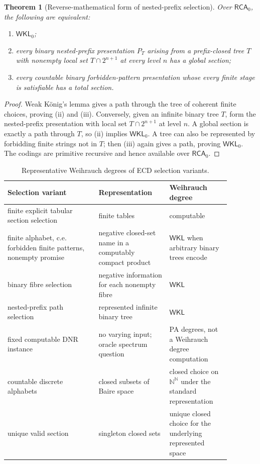 \documentclass[11pt]{article}
\theoremstyle{plain}
\newtheorem{theorem}{Theorem}[section]
\theoremstyle{definition}
\theoremstyle{remark}
\newcommand{\N}{\mathbb{N}}
\begin{document}
\begin{theorem}[Reverse-mathematical form of nested-prefix selection]
\label{thm:reverse-math-nested-prefix}
Over $\mathsf{RCA}_0$, the following are equivalent:
\begin{enumerate}[label=(\roman*)]
\item $\mathsf{WKL}_0$;
\item every binary nested-prefix presentation $P_T$ arising from a prefix-closed
tree $T$ with nonempty local set $T\cap2^{n+1}$ at every level $n$ has a global
section;
\item every countable binary forbidden-pattern presentation whose every finite
stage is satisfiable has a total section.
\end{enumerate}
\end{theorem}

\begin{proof}
Weak König's lemma \cite{konig,simpson} gives a path through the tree of
coherent finite choices,
proving (ii) and (iii). Conversely, given an infinite binary tree $T$, form the
nested-prefix presentation with local set $T\cap2^{n+1}$ at level $n$. A global
section is exactly a path through $T$, so (ii) implies $\mathsf{WKL}_0$. A tree
can also be represented by forbidding finite strings not in $T$; then (iii)
again gives a path, proving $\mathsf{WKL}_0$. The codings are primitive
recursive and hence available over $\mathsf{RCA}_0$.
\end{proof}

\begin{table}[htbp]
\centering
\caption{Representative Weihrauch degrees of ECD selection variants.}
\label{tab:weihrauch-classification}
\begin{tabular}{@{}p{0.36\linewidth}p{0.28\linewidth}p{0.24\linewidth}@{}}
\toprule
Selection variant & Representation & Weihrauch degree\\
\midrule
finite explicit tabular section selection & finite tables & computable\\
finite alphabet, c.e. forbidden finite patterns, nonempty promise & negative closed-set name in a computably compact product & $\mathsf{WKL}$ when arbitrary binary trees encode\\
binary fibre selection & negative information for each nonempty fibre & $\mathsf{WKL}$\\
nested-prefix path selection & represented infinite binary tree & $\mathsf{WKL}$\\
fixed computable DNR instance & no varying input; oracle spectrum question & PA degrees, not a Weihrauch degree computation\\
countable discrete alphabets & closed subsets of Baire space & closed choice on $\N^\N$ under the standard representation\\
unique valid section & singleton closed sets & unique closed choice for the underlying represented space\\
\bottomrule
\end{tabular}
\end{table}
\end{document}
